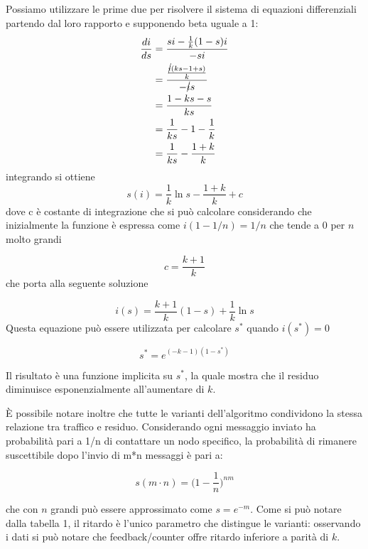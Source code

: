 Possiamo utilizzare le prime due per risolvere il sistema di equazioni differenziali partendo dal loro rapporto e supponendo beta uguale a 1:
\begin{equation}
    \begin{split}
        \frac{di}{ds}   & =  \frac{si - \frac{1}{k} (1-s) i}{-si} \\
        & = \frac{\frac{\cancel{i} (ks - 1 + s)}{k}}{- \cancel{i}s} \\
        & = \frac{1-ks-s}{ks} \\
        & = \frac{1}{ks} - 1 - \frac{1}{k} \\
        & = \frac{1}{ks} - \frac{1+k}{k} 
    \end{split}
\end{equation}
integrando si ottiene
\begin{equation}
    s(i) = \frac{1}{k} \ln s - \frac{1+k}{k} + c
\end{equation}
dove c è costante di integrazione che si può calcolare considerando che inizialmente la funzione è espressa come $i(1-1/n) = 1/n$ che tende a $0$ per $n$ molto grandi

\begin{equation}
    c = \frac{k+1}{k}
\end{equation}
che porta alla seguente soluzione

\begin{equation}
    i(s) = \frac{k+1}{k}(1-s) + \frac{1}{k} \ln s
\end{equation}
Questa equazione può essere utilizzata per calcolare $s^*$ quando $i(s^*) = 0$

\begin{equation}
    s^* = e^{(-k-1)(1-s^*)}
\end{equation}

Il risultato è una funzione implicita su $s^*$, la quale mostra che il residuo diminuisce esponenzialmente all'aumentare di $k$.

È possibile notare inoltre che tutte le varianti dell’algoritmo condividono la stessa relazione tra traffico e residuo. Considerando ogni messaggio inviato ha probabilità pari a 1/n di contattare un nodo specifico, la probabilità di rimanere suscettibile dopo l’invio di m*n messaggi è pari a:

\begin{equation}
    s(m\cdot n) = \Big(1-\frac{1}{n}\Big)^{nm}
\end{equation}

che con $n$ grandi può essere approssimato come $s = e^{-m}$.
Come si può notare dalla tabella 1, il ritardo è l’unico parametro che distingue le varianti: osservando i dati si può notare che feedback/counter offre ritardo inferiore a parità di $k$.





